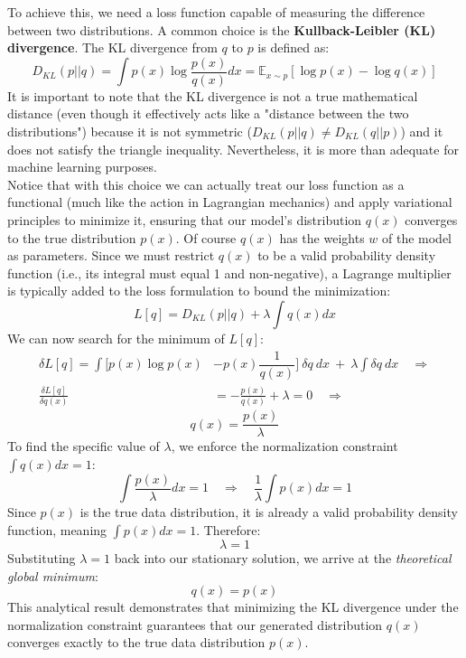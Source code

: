 To achieve this, we need a loss function capable of measuring the difference between two distributions. A common choice is the \textbf{Kullback-Leibler (KL) divergence}. The KL divergence from $q$ to $p$ is defined as:
\begin{equation}\label{eq:KL_div}
    D_{KL}(p||q) = \int p(x) \log \frac{p(x)}{q(x)} dx = \mathbb{E}_{x \sim p} [\log p(x) - \log q(x)]
\end{equation}
It is important to note that the KL divergence is not a true mathematical distance (even though it effectively acts like a "distance between the two distributions") because it is not symmetric ($D_{KL}(p||q) \neq D_{KL}(q||p)$) and it does not satisfy the triangle inequality. Nevertheless, it is more than adequate for machine learning purposes. \\
Notice that with this choice we can actually treat our loss function as a functional (much like the action in Lagrangian mechanics) and apply variational principles to minimize it, ensuring that our model's distribution $q(x)$ converges to the true distribution $p(x)$. Of course $q(x)$ has the weights $w$ of the model as parameters. Since we must restrict $q(x)$ to be a valid probability density function (i.e., its integral must equal 1 and non-negative), a Lagrange multiplier is typically added to the loss formulation to bound the minimization:
\begin{equation}
    L[q]=D_{KL}(p||q) + \lambda \int q(x) dx
\end{equation}
We can now search for the minimum of $L[q]$:
\begin{equation*}
\begin{aligned}
    \delta L[q]=\int [p(x)\log p(x) &- p(x)\dfrac{1}{q(x)}] \ \delta q \ dx \ + \ \lambda \int \delta q \ dx \quad \Rightarrow \\
    \frac{\delta L[q]}{\delta q(x)} &= -\frac{p(x)}{q(x)} + \lambda = 0 \quad \Rightarrow
\end{aligned}
\end{equation*}
\begin{equation}
    q(x) = \frac{p(x)}{\lambda}
\end{equation}
To find the specific value of $\lambda$, we enforce the normalization constraint $\int q(x) dx = 1$:
\begin{equation*}
    \int \frac{p(x)}{\lambda} dx = 1 \quad \Rightarrow \quad \frac{1}{\lambda} \int p(x) dx = 1
\end{equation*}
Since $p(x)$ is the true data distribution, it is already a valid probability density function, meaning $\int p(x) dx = 1$. Therefore:
\begin{equation}
    \lambda = 1
\end{equation}
Substituting $\lambda = 1$ back into our stationary solution, we arrive at the \textit{theoretical global minimum}:
\begin{equation}
    q(x) = p(x)
\end{equation}
This analytical result demonstrates that minimizing the KL divergence under the normalization constraint guarantees that our generated distribution $q(x)$ converges exactly to the true data distribution $p(x)$.

